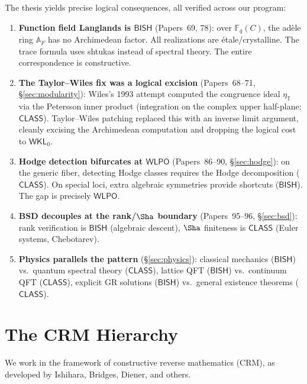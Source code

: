 \documentclass[11pt,a4paper]{article}
\theoremstyle{plain}
\theoremstyle{definition}
\newcommand{\BISH}{\textsf{BISH}}
\newcommand{\WKL}{\textsf{WKL}_0}
\newcommand{\WLPO}{\textsf{WLPO}}
\newcommand{\CLASS}{\textsf{CLASS}}
\newcommand{\F}{\mathbb{F}}
\newcommand{\A}{\mathbb{A}}
\begin{document}
The thesis yields precise logical consequences, all verified across our program:
\begin{enumerate}[label=(\roman*)]
\item \textbf{Function field Langlands is $\BISH$} (Papers~69, 78): over $\F_q(C)$, the ad\`ele ring $\A_F$ has no Archimedean factor. All realizations are \'etale/crystalline. The trace formula uses shtukas instead of spectral theory. The entire correspondence is constructive.

\item \textbf{The Taylor--Wiles fix was a logical excision} (Papers~68--71, \S\ref{sec:modularity}): Wiles's 1993 attempt computed the congruence ideal $\eta_\mathbb{T}$ via the Petersson inner product (integration on the complex upper half-plane: $\CLASS$). Taylor--Wiles patching replaced this with an inverse limit argument, cleanly excising the Archimedean computation and dropping the logical cost to $\WKL$.

\item \textbf{Hodge detection bifurcates at $\WLPO$} (Papers~86--90, \S\ref{sec:hodge}): on the generic fiber, detecting Hodge classes requires the Hodge decomposition ($\CLASS$). On special loci, extra algebraic symmetries provide shortcuts ($\BISH$). The gap is precisely $\WLPO$.

\item \textbf{BSD decouples at the rank/$\Sha$ boundary} (Papers~95--96, \S\ref{sec:bsd}): rank verification is $\BISH$ (algebraic descent), $\Sha$ finiteness is $\CLASS$ (Euler systems, Chebotarev). 

\item \textbf{Physics parallels the pattern} (\S\ref{sec:physics}): classical mechanics ($\BISH$) vs.\ quantum spectral theory ($\CLASS$), lattice QFT ($\BISH$) vs.\ continuum QFT ($\CLASS$), explicit GR solutions ($\BISH$) vs.\ general existence theorems ($\CLASS$).
\end{enumerate}


\section{The CRM Hierarchy}\label{sec:crm}

We work in the framework of constructive reverse mathematics (CRM), as developed by Ishihara, Bridges, Diener, and others. 
\end{document}
